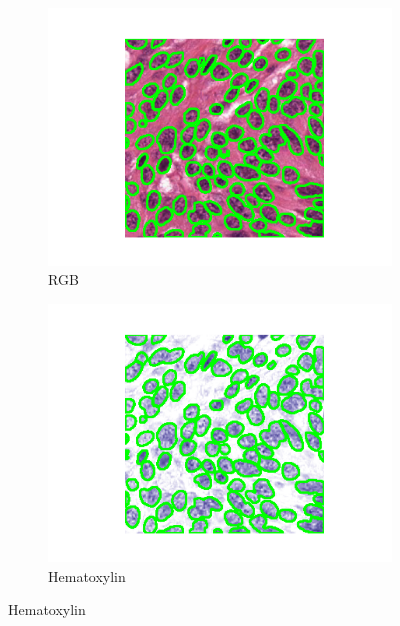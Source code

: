 \documentclass[target=bach,aauheader=,style=]{thud}
\begin{document}
\begin{figure}[!htbp]
\begin{subfigure}{0.48\textwidth}
  \centering
  \includegraphics[width=\linewidth]{imgs/qualitative/medium/RGB/contour_img.png}
  \caption{RGB}
\end{subfigure}\hfill
\begin{subfigure}{0.48\textwidth}
  \centering
  \includegraphics[width=\linewidth]{imgs/qualitative/medium/HE/contour_img.png}
  \caption{Hematoxylin}
\end{subfigure}


\end{figure}
\end{document}
